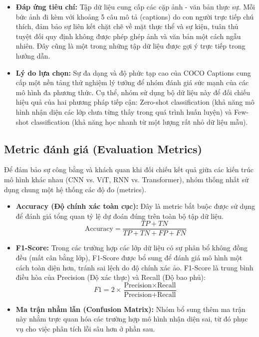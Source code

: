 \documentclass[a4paper]{article}
\theoremstyle{definition}
\begin{document}
\begin{itemize}
	\item \textbf{Đáp ứng tiêu chí:} Tập dữ liệu cung cấp các cặp ảnh - văn bản thực sự. Mỗi bức ảnh đi kèm với khoảng 5 câu mô tả (captions) do con người trực tiếp chú thích, đảm bảo sự liên kết chặt chẽ về mặt thực thể và sự kiện, tuân thủ tuyệt đối quy định không được phép ghép ảnh và văn bản một cách ngẫu nhiên. Đây cũng là một trong những tập dữ liệu được gợi ý trực tiếp trong hướng dẫn.

	\item \textbf{Lý do lựa chọn:} Sự đa dạng và độ phức tạp cao của COCO Captions cung cấp một nền tảng thử nghiệm lý tưởng để nhóm đánh giá sức mạnh của các mô hình đa phương thức. Cụ thể, nhóm sử dụng bộ dữ liệu này để đối chiếu hiệu quả của hai phương pháp tiếp cận: Zero-shot classification (khả năng mô hình nhận diện các lớp chưa từng thấy trong quá trình huấn luyện) và Few-shot classification (khả năng học nhanh từ một lượng rất nhỏ dữ liệu mẫu).
\end{itemize}

\subsection{Metric đánh giá (Evaluation Metrics)}

Để đảm bảo sự công bằng và khách quan khi đối chiếu kết quả giữa các kiến trúc mô hình khác nhau (CNN vs. ViT, RNN vs. Transformer), nhóm thống nhất sử dụng chung một hệ thống các độ đo (metrics).

\begin{itemize}
	\item \textbf{Accuracy (Độ chính xác toàn cục):} Đây là metric bắt buộc được sử dụng để đánh giá tổng quan tỷ lệ dự đoán đúng trên toàn bộ tập dữ liệu.
	      \begin{equation}
		      \text{Accuracy}=\frac{TP+TN}{TP+TN+FP+FN}
	      \end{equation}

	\item \textbf{F1-Score:} Trong các trường hợp các lớp dữ liệu có sự phân bổ không đồng đều (mất cân bằng lớp), F1-Score được bổ sung để đánh giá mô hình một cách toàn diện hơn, tránh sai lệch do độ chính xác ảo. F1-Score là trung bình điều hòa của Precision (Độ xác thực) và Recall (Độ bao phủ):
	      \begin{equation}
		      F1 = 2 \times \frac{\text{Precision} \times \text{Recall}}{\text{Precision} + \text{Recall}}
	      \end{equation}

	\item \textbf{Ma trận nhầm lẫn (Confusion Matrix):} Nhóm bổ sung thêm ma trận này nhằm trực quan hóa các trường hợp mô hình nhận diện sai, từ đó phục vụ cho việc phân tích lỗi sâu hơn ở phần sau.
\end{itemize}
\end{document}
